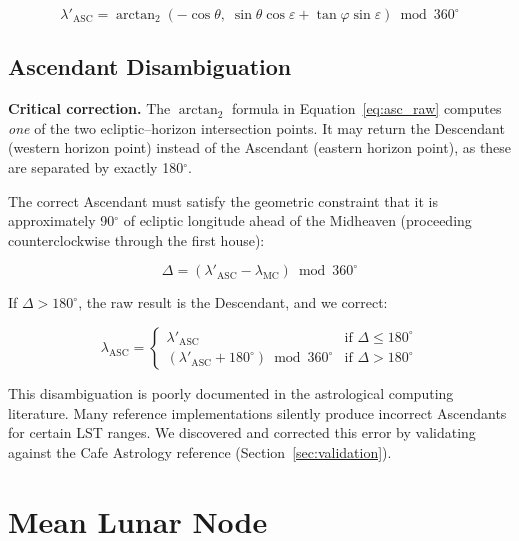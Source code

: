 \documentclass[11pt,letterpaper,twocolumn]{article}
\begin{document}
\begin{equation}\label{eq:asc_raw}
\lambda'_{\text{ASC}} = \arctan_2(-\cos\theta,\; \sin\theta\cos\varepsilon + \tan\varphi\sin\varepsilon) \bmod 360^\circ
\end{equation}

\subsection{Ascendant Disambiguation}\label{sec:asc_disambig}

\textbf{Critical correction.} The $\arctan_2$ formula in Equation~\ref{eq:asc_raw} computes \textit{one} of the two ecliptic--horizon intersection points. It may return the Descendant (western horizon point) instead of the Ascendant (eastern horizon point), as these are separated by exactly 180$^\circ$.

The correct Ascendant must satisfy the geometric constraint that it is approximately 90$^\circ$ of ecliptic longitude ahead of the Midheaven (proceeding counterclockwise through the first house):

\begin{equation}
\Delta = (\lambda'_{\text{ASC}} - \lambda_{\text{MC}}) \bmod 360^\circ
\end{equation}

If $\Delta > 180^\circ$, the raw result is the Descendant, and we correct:

\begin{equation}\label{eq:asc_fix}
\lambda_{\text{ASC}} = \begin{cases}
\lambda'_{\text{ASC}} & \text{if } \Delta \leq 180^\circ \\
(\lambda'_{\text{ASC}} + 180^\circ) \bmod 360^\circ & \text{if } \Delta > 180^\circ
\end{cases}
\end{equation}

This disambiguation is poorly documented in the astrological computing literature. Many reference implementations silently produce incorrect Ascendants for certain LST ranges. We discovered and corrected this error by validating against the Cafe Astrology reference (Section~\ref{sec:validation}).

\section{Mean Lunar Node}\label{sec:node}
\end{document}

